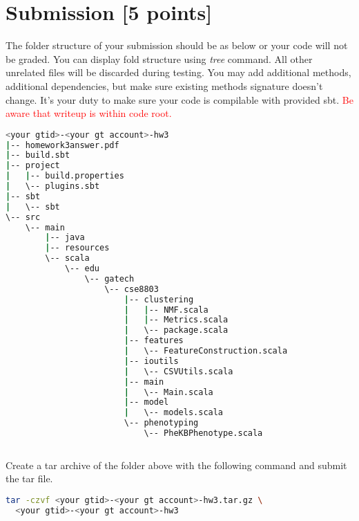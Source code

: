 \documentclass[12pt]{article}
\begin{document}
\section{Submission [5 points]}
The folder structure of your submission should be as below or your code will not be graded. You can display fold structure using \textit{tree} command. All other unrelated files will be discarded during testing. You may add additional methods, additional dependencies, but make sure  existing methods signature doesn't change. It's your duty to make sure your code is compilable with provided sbt. \textcolor{red}{Be aware that writeup is within code root.}
\begin{lstlisting}[language=bash,frame=single]
<your gtid>-<your gt account>-hw3
|-- homework3answer.pdf
|-- build.sbt
|-- project
|   |-- build.properties
|   \-- plugins.sbt
|-- sbt
|   \-- sbt
\-- src
    \-- main
        |-- java
        |-- resources
        \-- scala
            \-- edu
                \-- gatech
                    \-- cse8803
                        |-- clustering
                        |   |-- NMF.scala
                        |   |-- Metrics.scala
                        |   \-- package.scala
                        |-- features
                        |   \-- FeatureConstruction.scala
                        |-- ioutils
                        |   \-- CSVUtils.scala
                        |-- main
                        |   \-- Main.scala
                        |-- model
                        |   \-- models.scala
                        \-- phenotyping
                            \-- PheKBPhenotype.scala
   
\end{lstlisting}
Create a tar archive of the folder above with the following command and submit the tar file.
\begin{lstlisting}[language=bash,frame=single]
tar -czvf <your gtid>-<your gt account>-hw3.tar.gz \
  <your gtid>-<your gt account>-hw3
\end{lstlisting}
\end{document}
